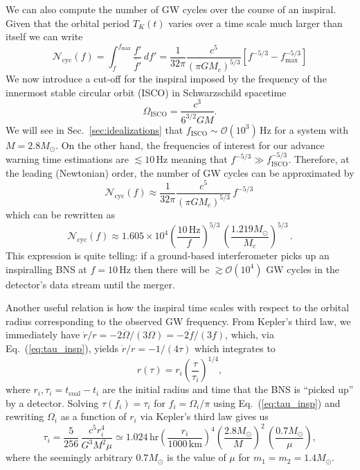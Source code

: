 \documentclass[prd,amsmath,amssymb,aps,floats,amsfonts,notitlepage,superscriptaddress,eqsecnum,nofootinbib,10pt]{revtex4-1}
\newcommand{\ord}{\mathcal{O}}
\newcommand{\f}{\frac}
\newcommand{\be}{\begin{equation}}
\newcommand{\ee}{\end{equation}}
\begin{document}
We can also compute the number of GW cycles over the course of an inspiral. Given that the orbital period $T_K(t)$ varies over a time scale much larger than itself
we can write
%
\be
\mathcal{N}_\text{cyc}(f) = \int_f^{f_\text{max}} \f{f'}{\dot{f'}}\, df' =\f{1}{32\pi} \f{c^5}{(\pi G M_c)^{5/3}}\left[ f^{-5/3}-f_\text{max}^{-5/3}\right] \label{eq:Ncyc1}
\ee
%
We now introduce a cut-off for the inspiral imposed by the frequency of the innermost stable circular orbit (ISCO) in Schwarzschild spacetime
\be
\Omega_\text{ISCO} = \f{c^3}{6^{3/2} G M} \label{eq:Sch_f_isco}.
\ee
%
%
We will see in Sec.~\ref{sec:idealizations} that $f_\text{ISCO} \sim \ord(10^3)\,$Hz for a system with $M =2.8 M_\odot$. 
On the other hand, the frequencies of interest for our advance warning time estimations are $\lesssim 10\,$Hz
meaning that $f^{-5/3} \gg f_\text{ISCO}^{-5/3}$. Therefore, at the leading (Newtonian) order, the number of GW cycles can be approximated by
%
\be
\mathcal{N}_\text{cyc}(f) \approx \f{1}{32\pi} \f{c^5}{(\pi G M_c)^{5/3}}\, f^{-5/3} \,  \label{eq:Ncyc2}
\ee
%
%
which can be rewritten as
\be
\mathcal{N}_\text{cyc}(f)\approx 1.605\times 10^4 \left(\f{10\,\text{Hz}}{f} \right)^{5/3}\,\left(\f{1.219 M_\odot}{M_c}\right)^{5/3}\label{eq:Ncyc3}\, .
\ee
%
This expression is quite telling: if a ground-based interferometer picks up an
inspiralling BNS at $f=10\,$Hz then there will be $\gtrsim \ord(10^4)$ GW cycles in the detector's data stream until the merger.

Another useful relation is how the inspiral time scales with respect to the orbital radius corresponding to the observed GW frequency.
From Kepler's third law, we immediately have $\dot{r}/r= -2\dot{\Omega}/(3\Omega)=-2\dot{f}/(3f)$, which, via Eq.~(\ref{eq:tau_insp}),
yields $\dot{r}/r= -1/(4\tau)$ which integrates to
%
\be
r(\tau)=r_i \left(\f{\tau}{\tau_i}\right)^{1/4}\label{eq:r_of_tau},
\ee
%
where $r_i, \tau_i=t_\text{coal}-t_i$ are the initial radius and time that the BNS
is ``picked up'' by a detector. Solving $\tau(f_i)=\tau_i$ for $f_i=\Omega_i/\pi$ using Eq.~(\ref{eq:tau_insp}) and rewriting $\Omega_i$ as a function of $r_i$ via
Kepler's third law gives us
%
\be
\tau_i = \f{5}{256}\, \f{c^5 r_i^4}{G^3 M^2 \mu}\simeq 1.024\,\text{hr} \left(\f{r_i}{1000\,\text{km}}\right)^4 \left(\f{2.8M_\odot}{M}\right)^2\,\left(\f{0.7M_\odot}{\mu}\right)
\label{eq:tau_of_r},
\ee
%
where the seemingly arbitrary $0.7M_\odot$ is the value of $\mu$ for $m_1=m_2=1.4M_\odot$.
\end{document}
